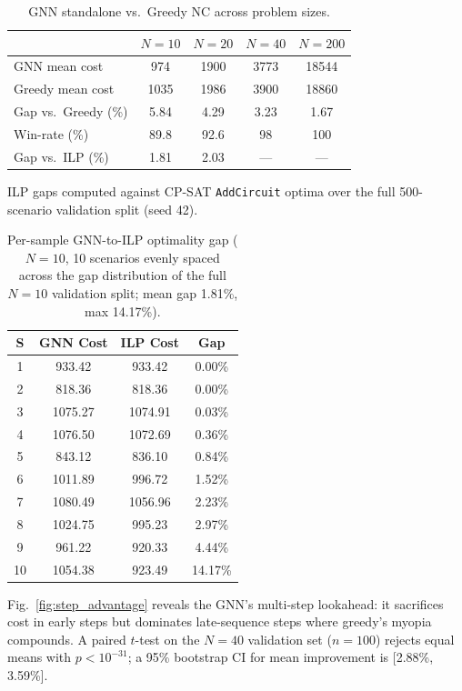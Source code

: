 \documentclass[conference]{IEEEtran}
\begin{document}
\begin{table}[htbp]
\caption{GNN standalone vs.\ Greedy NC across problem sizes.}
\label{tab:cross_size}
\centering
\begin{tabular}{@{}lcccc@{}}
\toprule
& $N{=}10$ & $N{=}20$ & $N{=}40$ & $N{=}200$ \\
\midrule
GNN mean cost        & 974   & 1900  & 3773  & 18544 \\
Greedy mean cost     & 1035  & 1986  & 3900  & 18860 \\
Gap vs.\ Greedy (\%)     & 5.84  & 4.29  & 3.23  & 1.67 \\
Win-rate (\%)        & 89.8  & 92.6  & 98    & 100 \\
Gap vs.\ ILP (\%)   & 1.81  & 2.03  & ---   & --- \\
\bottomrule
\end{tabular}
\vspace{1mm}

\footnotesize ILP gaps computed against CP-SAT \texttt{AddCircuit} optima over the full 500-scenario validation split (seed 42).
\end{table}

\begin{table}[htbp]
\caption{Per-sample GNN-to-ILP optimality gap ($N{=}10$, 10 scenarios evenly spaced across the gap distribution of the full $N{=}10$ validation split; mean gap 1.81\%, max 14.17\%).}
\label{tab:ilp_gap}
\centering
\begin{tabular}{@{}cccc@{}}
\toprule
\textbf{S} & \textbf{GNN Cost} & \textbf{ILP Cost} & \textbf{Gap} \\
\midrule
1  & 933.42  & 933.42  & 0.00\% \\
2  & 818.36  & 818.36  & 0.00\% \\
3  & 1075.27 & 1074.91 & 0.03\% \\
4  & 1076.50 & 1072.69 & 0.36\% \\
5  & 843.12  & 836.10  & 0.84\% \\
6  & 1011.89 & 996.72  & 1.52\% \\
7  & 1080.49 & 1056.96 & 2.23\% \\
8  & 1024.75 & 995.23  & 2.97\% \\
9  & 961.22  & 920.33  & 4.44\% \\
10 & 1054.38 & 923.49  & 14.17\% \\
\bottomrule
\end{tabular}
\end{table}

Fig.~\ref{fig:step_advantage} reveals the GNN's multi-step lookahead: it sacrifices cost in early steps but dominates late-sequence steps where greedy's myopia compounds. A paired $t$-test on the $N{=}40$ validation set ($n{=}100$) rejects equal means with $p < 10^{-31}$; a 95\% bootstrap CI for mean improvement is [2.88\%, 3.59\%].
\end{document}
